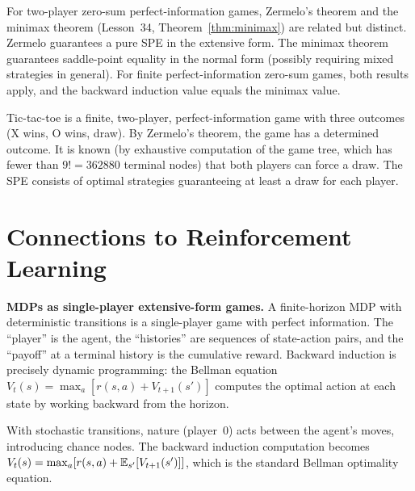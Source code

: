 \documentclass[11pt,a4paper]{article}
\begin{document}
\begin{remark}
\label{rem:zermelo_minimax}
For two-player zero-sum perfect-information games, Zermelo's theorem and the
minimax theorem (Lesson~34, Theorem~\ref{thm:minimax}) are related but
distinct. Zermelo guarantees a pure SPE in the extensive form. The minimax
theorem guarantees saddle-point equality in the normal form (possibly
requiring mixed strategies in general). For finite perfect-information
zero-sum games, both results apply, and the backward induction value equals
the minimax value.
\end{remark}

\begin{example}
\label{ex:tictactoe}
Tic-tac-toe is a finite, two-player, perfect-information game with three
outcomes (X wins, O wins, draw). By Zermelo's theorem, the game has a
determined outcome. It is known (by exhaustive computation of the game tree,
which has fewer than $9! = 362880$ terminal nodes) that both players can
force a draw. The SPE consists of optimal strategies guaranteeing at least a
draw for each player.
\end{example}


\section{Connections to Reinforcement Learning}
\label{sec:rl_connections}

\begin{rlconnection}
\textbf{MDPs as single-player extensive-form games.} A finite-horizon MDP
with deterministic transitions is a single-player game with perfect
information. The ``player'' is the agent, the ``histories'' are sequences of
state-action pairs, and the ``payoff'' at a terminal history is the
cumulative reward. Backward induction is precisely dynamic programming: the
Bellman equation $V_t(s) = \max_a [r(s,a) + V_{t+1}(s')]$ computes the
optimal action at each state by working backward from the horizon.

With stochastic transitions, nature (player~0) acts between the agent's
moves, introducing chance nodes. The backward induction computation becomes
$V_t(s) = \max_a [r(s,a) + \mathbb{E}_{s'}[V_{t+1}(s')]]$, which is the standard
Bellman optimality equation.
\end{rlconnection}
\end{document}
